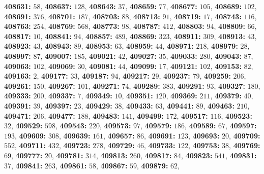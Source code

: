 \textsf{\bfseries 408631:} $58$, \textsf{\bfseries 408637:} $128$, \textsf{\bfseries 408643:} $37$, \textsf{\bfseries 408659:} $77$, \textsf{\bfseries 408677:} $105$, \textsf{\bfseries 408689:} $102$, \textsf{\bfseries 408691:} $376$, \textsf{\bfseries 408701:} $187$, \textsf{\bfseries 408703:} $88$, \textsf{\bfseries 408713:} $91$, \textsf{\bfseries 408719:} $17$, \textsf{\bfseries 408743:} $116$, \textsf{\bfseries 408763:} $254$, \textsf{\bfseries 408769:} $568$, \textsf{\bfseries 408773:} $98$, \textsf{\bfseries 408787:} $412$, \textsf{\bfseries 408803:} $94$, \textsf{\bfseries 408809:} $66$, \textsf{\bfseries 408817:} $10$, \textsf{\bfseries 408841:} $94$, \textsf{\bfseries 408857:} $489$, \textsf{\bfseries 408869:} $323$, \textsf{\bfseries 408911:} $309$, \textsf{\bfseries 408913:} $43$, \textsf{\bfseries 408923:} $43$, \textsf{\bfseries 408943:} $89$, \textsf{\bfseries 408953:} $63$, \textsf{\bfseries 408959:} $44$, \textsf{\bfseries 408971:} $218$, \textsf{\bfseries 408979:} $28$, \textsf{\bfseries 408997:} $87$, \textsf{\bfseries 409007:} $185$, \textsf{\bfseries 409021:} $42$, \textsf{\bfseries 409027:} $35$, \textsf{\bfseries 409033:} $280$, \textsf{\bfseries 409043:} $87$, \textsf{\bfseries 409063:} $102$, \textsf{\bfseries 409069:} $30$, \textsf{\bfseries 409081:} $44$, \textsf{\bfseries 409099:} $17$, \textsf{\bfseries 409121:} $102$, \textsf{\bfseries 409153:} $82$, \textsf{\bfseries 409163:} $2$, \textsf{\bfseries 409177:} $33$, \textsf{\bfseries 409187:} $94$, \textsf{\bfseries 409217:} $29$, \textsf{\bfseries 409237:} $79$, \textsf{\bfseries 409259:} $206$, \textsf{\bfseries 409261:} $150$, \textsf{\bfseries 409267:} $101$, \textsf{\bfseries 409271:} $74$, \textsf{\bfseries 409289:} $383$, \textsf{\bfseries 409291:} $93$, \textsf{\bfseries 409327:} $180$, \textsf{\bfseries 409333:} $200$, \textsf{\bfseries 409337:} $7$, \textsf{\bfseries 409349:} $10$, \textsf{\bfseries 409351:} $120$, \textsf{\bfseries 409369:} $211$, \textsf{\bfseries 409379:} $40$, \textsf{\bfseries 409391:} $39$, \textsf{\bfseries 409397:} $23$, \textsf{\bfseries 409429:} $38$, \textsf{\bfseries 409433:} $63$, \textsf{\bfseries 409441:} $89$, \textsf{\bfseries 409463:} $210$, \textsf{\bfseries 409471:} $206$, \textsf{\bfseries 409477:} $188$, \textsf{\bfseries 409483:} $141$, \textsf{\bfseries 409499:} $172$, \textsf{\bfseries 409517:} $116$, \textsf{\bfseries 409523:} $32$, \textsf{\bfseries 409529:} $598$, \textsf{\bfseries 409543:} $220$, \textsf{\bfseries 409573:} $97$, \textsf{\bfseries 409579:} $186$, \textsf{\bfseries 409589:} $67$, \textsf{\bfseries 409597:} $193$, \textsf{\bfseries 409609:} $308$, \textsf{\bfseries 409639:} $161$, \textsf{\bfseries 409657:} $86$, \textsf{\bfseries 409691:} $123$, \textsf{\bfseries 409693:} $20$, \textsf{\bfseries 409709:} $552$, \textsf{\bfseries 409711:} $432$, \textsf{\bfseries 409723:} $278$, \textsf{\bfseries 409729:} $46$, \textsf{\bfseries 409733:} $122$, \textsf{\bfseries 409753:} $38$, \textsf{\bfseries 409769:} $69$, \textsf{\bfseries 409777:} $20$, \textsf{\bfseries 409781:} $314$, \textsf{\bfseries 409813:} $260$, \textsf{\bfseries 409817:} $84$, \textsf{\bfseries 409823:} $541$, \textsf{\bfseries 409831:} $37$, \textsf{\bfseries 409841:} $263$, \textsf{\bfseries 409861:} $58$, \textsf{\bfseries 409867:} $59$, \textsf{\bfseries 409879:} $62$, 
